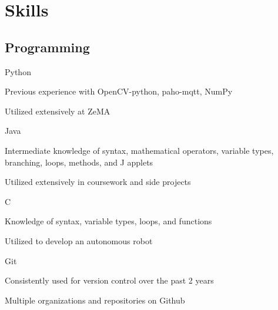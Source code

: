 \documentclass[]{resume}
\begin{document}
\begin{minipage}[t]{0.33\textwidth}
\section{Skills}
\subsection{Programming}
Python
\begin{tightemize}
\vspace{\topsep}
\item Previous experience with OpenCV-python, paho-mqtt, NumPy 
\item Utilized extensively at ZeMA\end{tightemize}
\vspace{\topsep}
Java 
\begin{tightemize}
\vspace{\topsep}
\item Intermediate knowledge of syntax, mathematical operators, variable types, branching, loops, methods, and J applets 
\item Utilized extensively in coursework and side projects\end{tightemize}
\vspace{\topsep}
C
\begin{tightemize}
\vspace{\topsep}
\item Knowledge of syntax, variable types, loops, and functions 
\item Utilized to develop an autonomous robot\end{tightemize}
\vspace{\topsep}
Git
\begin{tightemize}
\vspace{\topsep}
\item Consistently used for version control over the past 2 years \item Multiple organizations and repositories on Github\end{tightemize}


%
%

\end{minipage} 
\hfill
\end{document}
